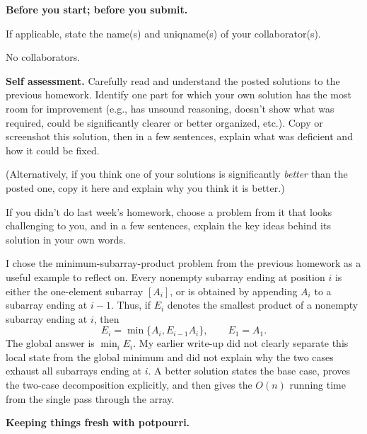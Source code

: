 \documentclass[11pt,addpoints,answers]{exam}
\begin{document}
\hwpreface

\begin{questions}

  \addtocounter{question}{-1}
  \question \textbf{Before you start; before you submit.}

  If applicable, state the name(s) and uniqname(s) of your collaborator(s).

  \begin{solution}
    No collaborators.
  \end{solution}

\question[10] \textbf{Self assessment.} \nopagebreak
  Carefully read and understand the posted solutions to the previous homework.
  Identify one part for which your own solution has the most room for improvement (e.g., has unsound reasoning, doesn't show what was required, could be significantly clearer or better organized, etc.).
  Copy or screenshot this solution, then in a few sentences, explain what was deficient and how it could be fixed.

  (Alternatively, if you think one of your solutions is significantly \emph{better} than the posted one, copy it here and explain why you think it is better.)

  If you didn't do last week's homework, choose a problem from it that looks challenging to you, and in a few sentences, explain the key ideas behind its solution in your own words.

  \begin{solution}
    I chose the minimum-subarray-product problem from the previous homework as a
    useful example to reflect on.  Every nonempty subarray ending at position
    $i$ is either the one-element subarray $[A_i]$, or is obtained by appending
    $A_i$ to a subarray ending at $i-1$.  Thus, if $E_i$ denotes the smallest
    product of a nonempty subarray ending at $i$, then
    \[
      E_i=\min\{A_i,E_{i-1}A_i\},\qquad E_1=A_1.
    \]
    The global answer is $\min_i E_i$.  My earlier write-up did not clearly
    separate this local state from the global minimum and did not explain why
    the two cases exhaust all subarrays ending at $i$.  A better solution states
    the base case, proves the two-case decomposition explicitly, and then gives
    the $O(n)$ running time from the single pass through the array.
  \end{solution}

\question \textbf{Keeping things fresh with potpourri.}
\end{questions}
\end{document}
